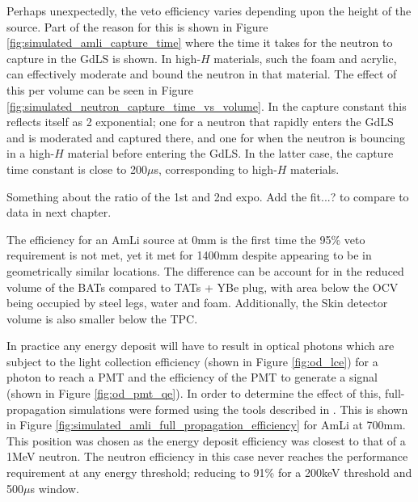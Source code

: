\par
Perhaps unexpectedly, the veto efficiency varies depending upon the height of the source.
Part of the reason for this is shown in Figure \ref{fig:simulated_amli_capture_time} where the time it takes for the neutron to capture in the GdLS is shown.
In high-$H$ materials, such the foam and acrylic, can effectively moderate and bound the neutron in that material.
The effect of this per volume can be seen in Figure \ref{fig:simulated_neutron_capture_time_vs_volume}.
In the capture constant this reflects itself as 2 exponential; one for a neutron that rapidly enters the GdLS and is moderated and captured there, and one for when the neutron is bouncing in a high-$H$ material before entering the GdLS.
In the latter case, the capture time constant is close to 200$\mu$s, corresponding to high-$H$ materials.
\par
Something about the ratio of the 1st and 2nd expo.
Add the fit...? to compare to data in next chapter.

\par
The efficiency for an AmLi source at 0mm is the first time the 95\% veto requirement is not met, yet it met for 1400mm despite appearing to be in geometrically similar locations.
The difference can be account for in the reduced volume of the BATs compared to TATs + YBe plug, with area below the OCV being occupied by steel legs, water and foam.
Additionally, the Skin detector volume is also smaller below the TPC.






\par
In practice any energy deposit will have to result in optical photons which are subject to the light collection efficiency (shown in Figure \ref{fig:od_lce}) for a photon to reach a PMT and the efficiency of the PMT to generate a signal (shown in Figure \ref{fig:od_pmt_qe}).
In order to determine the effect of this, full-propagation simulations were formed using the tools described in \cite{lz_simulations_ref}.
This is shown in Figure \ref{fig:simulated_amli_full_propagation_efficiency} for AmLi at 700mm. 
This position was chosen as the energy deposit efficiency was closest to that of a 1MeV neutron.
The neutron efficiency in this case never reaches the performance requirement at any energy threshold; reducing to 91\% for a 200keV threshold and 500$\mu$s window.

